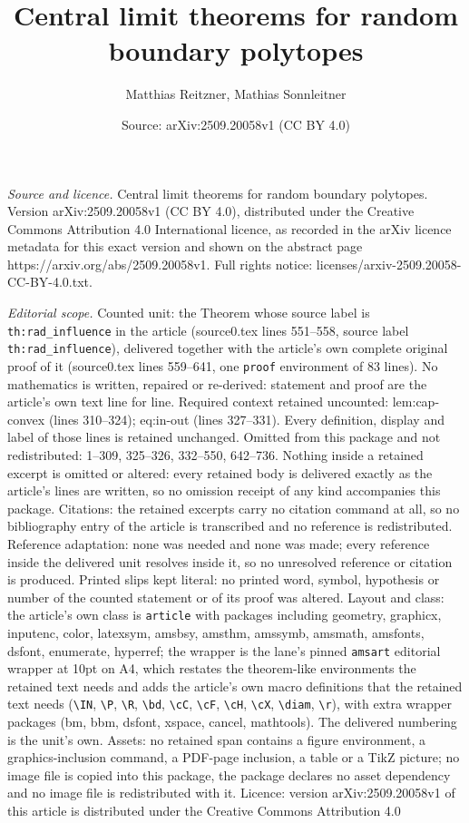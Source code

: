 \documentclass[10pt,a4paper]{amsart}
\title[Central limit theorems for random boundary polytopes]{Central limit theorems for random boundary polytopes}
\author{Matthias Reitzner, Mathias Sonnleitner}
\date{Source: arXiv:2509.20058v1 (CC BY 4.0)}
\begin{document}
\maketitle

\noindent\emph{Source and licence.} Central limit theorems for random boundary polytopes. Version arXiv:2509.20058v1 (CC BY 4.0), distributed under the Creative Commons Attribution 4.0 International licence, as recorded in the arXiv licence metadata for this exact version and shown on the abstract page https://arxiv.org/abs/2509.20058v1. Full rights notice: licenses/arxiv-2509.20058-CC-BY-4.0.txt.\par\smallskip

\noindent\textit{Editorial scope.} Counted unit: the Theorem whose source label is \texttt{th:rad\_influence} in the article (source0.tex lines 551--558, source label \texttt{th:rad\_influence}), delivered together with the article's own complete original proof of it (source0.tex lines 559--641, one \texttt{proof} environment of 83 lines). No mathematics is written, repaired or re-derived: statement and proof are the article's own text line for line. Required context retained uncounted: lem:cap-convex (lines 310--324); eq:in-out (lines 327--331). Every definition, display and label of those lines is retained unchanged. Omitted from this package and not redistributed: 1--309, 325--326, 332--550, 642--736. Nothing inside a retained excerpt is omitted or altered: every retained body is delivered exactly as the article's lines are written, so no omission receipt of any kind accompanies this package. Citations: the retained excerpts carry no citation command at all, so no bibliography entry of the article is transcribed and no reference is redistributed. Reference adaptation: none was needed and none was made; every reference inside the delivered unit resolves inside it, so no unresolved reference or citation is produced. Printed slips kept literal: no printed word, symbol, hypothesis or number of the counted statement or of its proof was altered. Layout and class: the article's own class is \texttt{article} with packages including geometry, graphicx, inputenc, color, latexsym, amsbsy, amsthm, amssymb, amsmath, amsfonts, dsfont, enumerate, hyperref; the wrapper is the lane's pinned \texttt{amsart} editorial wrapper at 10pt on A4, which restates the theorem-like environments the retained text needs and adds the article's own macro definitions that the retained text needs (\texttt{\textbackslash IN}, \texttt{\textbackslash P}, \texttt{\textbackslash R}, \texttt{\textbackslash bd}, \texttt{\textbackslash cC}, \texttt{\textbackslash cF}, \texttt{\textbackslash cH}, \texttt{\textbackslash cX}, \texttt{\textbackslash diam}, \texttt{\textbackslash r}), with extra wrapper packages (bm, bbm, dsfont, xspace, cancel, mathtools). The delivered numbering is the unit's own. Assets: no retained span contains a figure environment, a graphics-inclusion command, a PDF-page inclusion, a table or a TikZ picture; no image file is copied into this package, the package declares no asset dependency and no image file is redistributed with it. Licence: version arXiv:2509.20058v1 of this article is distributed under the Creative Commons Attribution 4.0 
\end{document}
